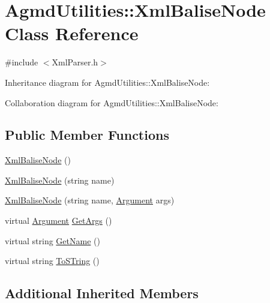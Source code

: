 \hypertarget{class_agmd_utilities_1_1_xml_balise_node}{\section{Agmd\+Utilities\+:\+:Xml\+Balise\+Node Class Reference}
\label{class_agmd_utilities_1_1_xml_balise_node}
}


{\ttfamily \#include $<$Xml\+Parser.\+h$>$}



Inheritance diagram for Agmd\+Utilities\+:\+:Xml\+Balise\+Node\+:


Collaboration diagram for Agmd\+Utilities\+:\+:Xml\+Balise\+Node\+:
\subsection*{Public Member Functions}
\begin{DoxyCompactItemize}
\item 
\hyperlink{class_agmd_utilities_1_1_xml_balise_node_a4ec31b7a44bd8ad85da2db8c05e46774}{Xml\+Balise\+Node} ()
\item 
\hyperlink{class_agmd_utilities_1_1_xml_balise_node_aba0cece5472dd4a3a23822d807ba84f7}{Xml\+Balise\+Node} (string name)
\item 
\hyperlink{class_agmd_utilities_1_1_xml_balise_node_abd69ca34bb878ccbb5f399e5afd3d4c1}{Xml\+Balise\+Node} (string name, \hyperlink{namespace_agmd_utilities_a93ce0bfe1d978003fb0319f5b3763e2c}{Argument} args)
\item 
virtual \hyperlink{namespace_agmd_utilities_a93ce0bfe1d978003fb0319f5b3763e2c}{Argument} \hyperlink{class_agmd_utilities_1_1_xml_balise_node_aa128f9076fc38c9cca05f628ef0eaf2c}{Get\+Args} ()
\item 
virtual string \hyperlink{class_agmd_utilities_1_1_xml_balise_node_a91c977e870558bed5f895fce2f6f36a2}{Get\+Name} ()
\item 
virtual string \hyperlink{class_agmd_utilities_1_1_xml_balise_node_a6e6275c37594b92185f3fec4bcd85f2d}{To\+S\+Tring} ()
\end{DoxyCompactItemize}
\subsection*{Additional Inherited Members}


